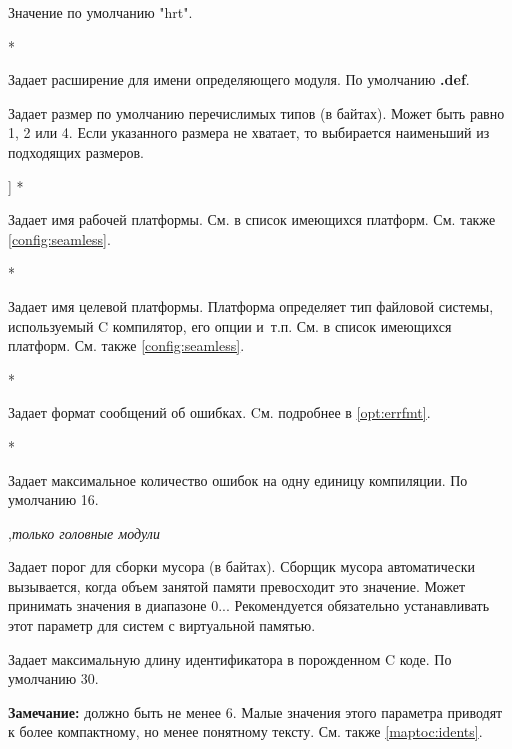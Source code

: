 \begin{description}
Значение по умолчанию "hrt".

        \MLBegin{}*\MLEnd{}

Задает расширение для имени \mt{} определяющего модуля.
По умолчанию {\bf .def}.

        \MLBegin{}\ModeC{}\MLEnd \inline

Задает размер по умолчанию перечислимых типов (в байтах).
Может быть равно 1, 2 или 4. Если указанного размера не хватает,
то выбирается наименьший из подходящих размеров.

\ifgenc                                                  ]
        \MLBegin{}*\MLEnd{}

Задает имя рабочей платформы. См. в
{\tt \cfg} список имеющихся платформ. 
См. также \ref{config:seamless}.

\fi

\ifgenc
{}
        \MLBegin{}*\MLEnd{}

Задает имя целевой платформы. Платформа определяет тип файловой системы, 
используемый C компилятор, его опции и~т.п. 
См. в {\tt \cfg} список имеющихся платформ. 
См. также \ref{config:seamless}.
\fi

        \MLBegin{}*\MLEnd{}

Задает формат сообщений об ошибках.
Cм. подробнее в \ref{opt:errfmt}.

        \MLBegin{}*\MLEnd{}

Задает максимальное количество ошибок на одну единицу компиляции.
По умолчанию 16.

        \MLBegin{}\ModeC{},{\em только головные модули}\MLEnd{}

Задает порог для сборки мусора (в байтах). Сборщик мусора
автоматически вызывается, когда объем занятой памяти 
превосходит это значение.
Может принимать значения в диапазоне 0... 
Рекомендуется обязательно устанавливать этот параметр для систем 
с виртуальной памятью.

\ifgenc
{}
        \MLBegin{}\ModeC{}\MLEnd{}

Задает максимальную длину идентификатора в порожденном C коде.
По умолчанию 30.

{\bf Замечание:} должно быть не менее 6. Малые значения этого параметра
приводят к более компактному, но менее понятному тексту.
См. также \ref{maptoc:idents}.
\fi


\end{description}
